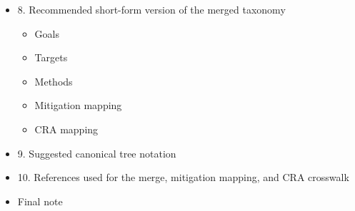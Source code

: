 \documentclass[10pt,a4paper,oneside]{report}
\begin{document}
\begin{itemize}
\begin{itemize}
\end{itemize}
\item 8. Recommended short-form version of the merged taxonomy
\begin{itemize}
\item Goals
\item Targets
\item Methods
\item Mitigation mapping
\item CRA mapping
\end{itemize}
\item 9. Suggested canonical tree notation
\item 10. References used for the merge, mitigation mapping, and CRA crosswalk
\item Final note
\end{itemize}
\end{document}
